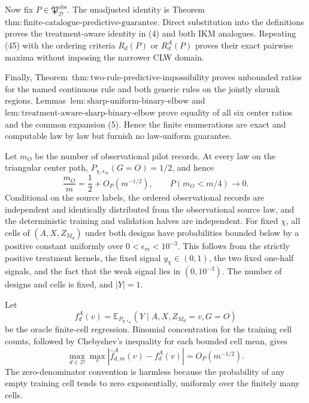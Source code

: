 Now fix \(P\in\mathfrak P_{\mathcal D}^{\mathrm{obs}}\).  The unadjusted identity is Theorem~\(\mathrm{thm{:}finite\text{-}catalogue\text{-}predictive\text{-}guarantee}\).  Direct substitution into the definitions proves the treatment-aware identity in (4) and both IKM analogues.  Repeating (45) with the ordering criteria \(R_d(P)\) or \(R_d^A(P)\) proves their exact pairwise maxima without imposing the narrower CLW domain.

Finally, Theorem~\(\mathrm{thm{:}two\text{-}rule\text{-}predictive\text{-}impossibility}\) proves unbounded ratios for the named continuous rule and both generic rules on the jointly shrunk regions.  Lemmas~\(\mathrm{lem{:}sharp\text{-}uniform\text{-}binary\text{-}elbow}\) and \(\mathrm{lem{:}treatment\text{-}aware\text{-}sharp\text{-}binary\text{-}elbow}\) prove equality of all six center ratios and the common expansion (5).  Hence the finite enumerations are exact and computable law by law but furnish no law-uniform guarantee.

Let \(m_O\) be the number of observational pilot records.  At every law on the triangular center path, \(P_{\chi,\epsilon_m}(G=O)=1/2\), and hence
\[
 \frac{m_O}{m}=\frac12+O_P(m^{-1/2}),
 \qquad P(m_O<m/4)\longrightarrow0.                       \tag{46}
\]
Conditional on the source labels, the ordered observational records are independent and identically distributed from the observational source law, and the deterministic training and validation halves are independent.  For fixed \(\chi\), all cells of \((A,X,Z_{M_d})\) under both designs have probabilities bounded below by a positive constant uniformly over \(0<\epsilon_m<10^{-3}\).  This follows from the strictly positive treatment kernels, the fixed signal \(y_\chi\in(0,1)\), the two fixed one-half signals, and the fact that the weak signal lies in \((0,10^{-3})\).  The number of designs and cells is fixed, and \(|Y|=1\).

Let
\[
 f_d^A(v)=\mathbb E_{P_{\chi,\epsilon_m}}(Y\mid A,X,Z_{M_d}=v,G=O)
\]
be the oracle finite-cell regression.  Binomial concentration for the training cell counts, followed by Chebyshev's inequality for each bounded cell mean, gives
\[
 \max_{d\in\mathcal D}\max_v
 |\widehat f_{d,m}^A(v)-f_d^A(v)|=O_P(m^{-1/2}).            \tag{47}
\]
The zero-denominator convention is harmless because the probability of any empty training cell tends to zero exponentially, uniformly over the finitely many cells.

